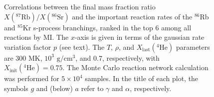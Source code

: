 \begin{figure}[!p]
\begin{subfigure}[b]{0.495\textwidth}
\end{subfigure}
\caption{\label{fig:Correlations_87Rb86Sr_ng}Correlations between the final mass fraction ratio $X(^{87}\mathrm{Rb})/X(^{86}\mathrm{Sr})$ and the important reaction rates of the $^{86}$Rb and $^{85}$Kr s-process branchings, ranked in the top 6 among all reactions by MI. The $x$-axis is given in terms of the gaussian rate variation factor $p$ (see text). The $T$, $\rho$, and $X_{\mathrm{last}}(^{4}\mathrm{He})$ parameters are 300 MK, $10^{3}$ $\mathrm{g}/\mathrm{cm}^{3}$, and 0.7, respectively, with $X_{\mathrm{init}}(^{4}\mathrm{He}) = 0.75$. The Monte Carlo reaction network calculation was performed for $5 \times 10^{4}$ samples. In the title of each plot, the symbols $g$ and (below) $a$ refer to $\gamma$ and $\alpha$, respectively.}
\end{figure}

